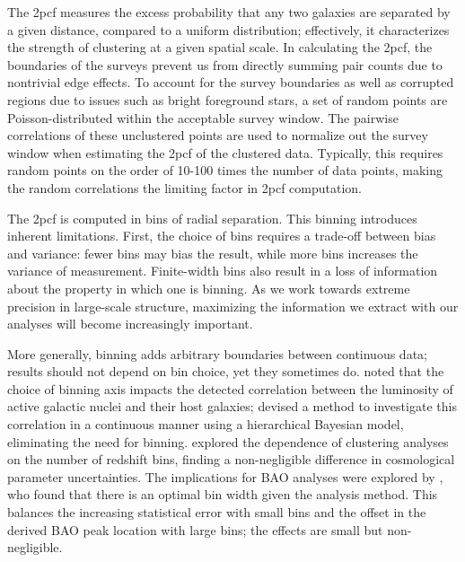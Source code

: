 \documentclass[modern]{aastex62}
\newcommand{\cf}{2pcf\xspace} %
\begin{document}
The \cf measures the excess probability that any two galaxies are separated by a given distance, compared to a uniform distribution; effectively, it characterizes the strength of clustering at a given spatial scale. 
In calculating the \cf, the boundaries of the surveys prevent us from directly summing pair counts due to nontrivial edge effects.
To account for the survey boundaries as well as corrupted regions due to issues such as bright foreground stars, a set of random points are Poisson-distributed within the acceptable survey window. 
The pairwise correlations of these unclustered points are used to normalize out the survey window when estimating the \cf of the clustered data.
Typically, this requires random points on the order of 10-100 times the number of data points, making the random correlations the limiting factor in \cf computation.

The \cf is computed in bins of radial separation.
This binning introduces inherent limitations.
First, the choice of bins requires a trade-off between bias and variance: fewer bins may bias the result, while more bins increases the variance of measurement.
Finite-width bins also result in a loss of information about the property in which one is binning.
As we work towards extreme precision in large-scale structure, maximizing the information we extract with our analyses will become increasingly important. 

More generally, binning adds arbitrary boundaries between continuous data; results should not depend on bin choice, yet they sometimes do.
\cite{Lanzuisi2017} noted that the choice of binning axis impacts the detected correlation between the luminosity of active galactic nuclei and their host galaxies; \cite{Grimmett2020} devised a method to investigate this correlation in a continuous manner using a hierarchical Bayesian model, eliminating the need for binning.
\cite{Bailoni2016} explored the dependence of clustering analyses on the number of redshift bins, finding a non-negligible difference in cosmological parameter uncertainties.
The implications for BAO analyses were explored by \cite{Percival2014}, who found that there is an optimal bin width given the analysis method.
This balances the increasing statistical error with small bins and the offset in the derived BAO peak location with large bins; the effects are small but non-negligible.
\end{document}
